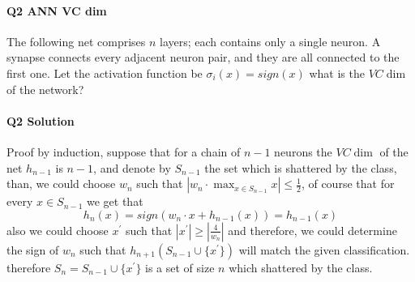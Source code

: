 \documentclass{article}
\begin{document}
\paragraph{Q2 ANN VC dim} 
The following net comprises \( n \) layers; each contains only a single neuron. A synapse connects every adjacent neuron pair, and they are all connected to the first one. Let the activation function be \( \sigma_{i} (x) = sign(x)\) what is the \( VC \dim \) of the network? 



\paragraph{Q2 Solution}

Proof by induction, suppose that for a chain of \( n - 1 \) neurons the \( VC \dim \) of the net \( h_{n-1} \) is \(n-1\), and denote by \(S_{n-1} \) the set which is shattered by the class, than, we could choose \( w_n \) such that \( |w_n \cdot \max_{x \in S_{n-1}}{ x } |  \le \frac{1}{2} \), of course that for every \(x \in S_{n-1} \) we get  that \[ h_n (x) = sign(w_n \cdot x + h_{n-1}(x) ) = h_{n-1}(x) \] also we could choose \( x^{\prime}\) such that \( |x^{\prime}| \ge |\frac{4}{w_n}| \) and therefore, we could determine the sign of \( w_n \) such that \( h_{n+1} ( S_{n-1} \cup \{ x^{\prime} \} ) \) will match the given classification. therefore \( S_{n} = S_{n-1} \cup \{ x^{\prime} \} \) is a set of size \( n \) which shattered by the class.
\end{document}
